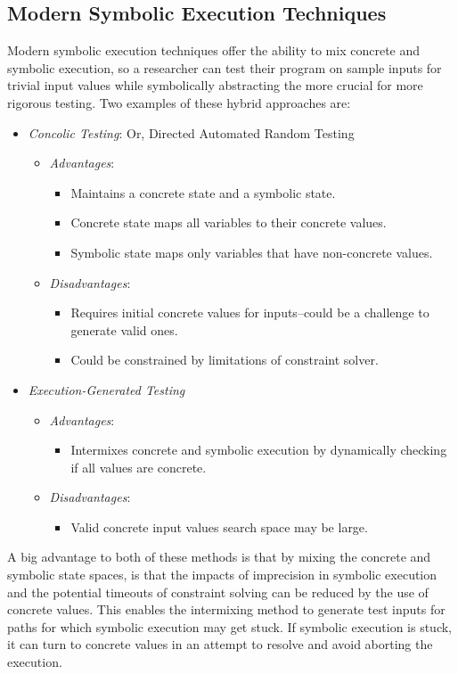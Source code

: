 \documentclass[11pt, journal]{IEEEtran}
\begin{document}
\subsection{Modern Symbolic Execution Techniques}
Modern symbolic execution techniques offer the ability to mix concrete and symbolic execution, so a researcher can test their program on sample inputs for trivial input values while symbolically abstracting the more crucial for more rigorous testing. Two examples of these hybrid approaches are:
\begin{itemize}
	\item \textit{Concolic Testing}: Or, Directed Automated Random Testing
	\begin{itemize}
		\item \textit{Advantages}: 
		\begin{itemize}
			\item Maintains a concrete state and a symbolic state.
			\item Concrete state maps all variables to their concrete values.
			\item Symbolic state maps only variables that have non-concrete values.
		\end{itemize}
		\item \textit{Disadvantages}: 
		\begin{itemize}
			\item Requires initial concrete values for inputs--could be a challenge to generate valid ones.
			\item Could be constrained by limitations of constraint solver.
		\end{itemize}
	\end{itemize}
	\item \textit{Execution-Generated Testing}
	\begin{itemize}
		\item \textit{Advantages}:
		\begin{itemize}
			\item Intermixes concrete and symbolic execution by dynamically checking if all values are concrete.
		\end{itemize}
		\item \textit{Disadvantages}:
		\begin{itemize}
			\item Valid concrete input values search space may be large.
		\end{itemize}
	\end{itemize}
\end{itemize}
A big advantage to both of these methods is that by mixing the concrete and symbolic state spaces, is that the impacts of imprecision in symbolic execution and the potential timeouts of constraint solving can be reduced by the use of concrete values. This enables the intermixing method to generate test inputs for paths for which symbolic execution may get stuck. If symbolic execution is stuck, it can turn to concrete values in an attempt to resolve and avoid aborting the execution.
\end{document}
